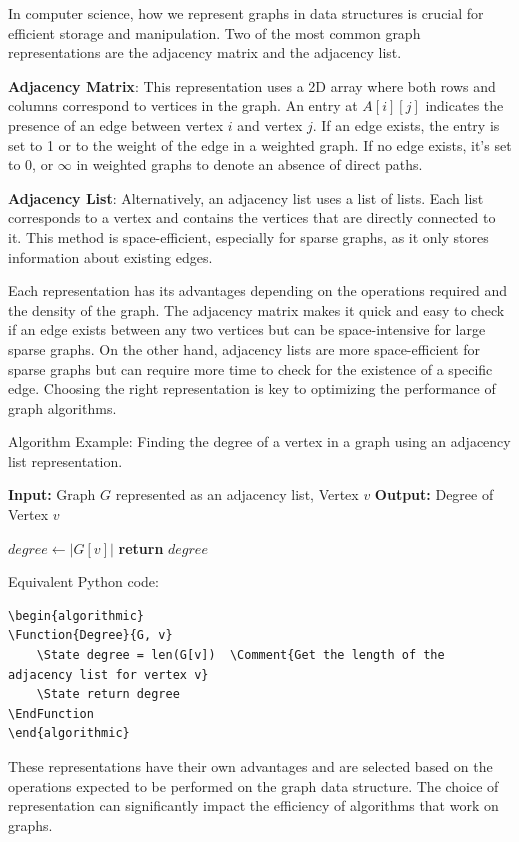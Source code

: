 \documentclass[12pt]{book} %
\begin{document}
In computer science, how we represent graphs in data structures is crucial for efficient storage and manipulation. Two of the most common graph representations are the adjacency matrix and the adjacency list.

\textbf{Adjacency Matrix}: This representation uses a 2D array where both rows and columns correspond to vertices in the graph. An entry at \(A[i][j]\) indicates the presence of an edge between vertex \(i\) and vertex \(j\). If an edge exists, the entry is set to 1 or to the weight of the edge in a weighted graph. If no edge exists, it's set to 0, or \(\infty\) in weighted graphs to denote an absence of direct paths.

\textbf{Adjacency List}: Alternatively, an adjacency list uses a list of lists. Each list corresponds to a vertex and contains the vertices that are directly connected to it. This method is space-efficient, especially for sparse graphs, as it only stores information about existing edges.

Each representation has its advantages depending on the operations required and the density of the graph. The adjacency matrix makes it quick and easy to check if an edge exists between any two vertices but can be space-intensive for large sparse graphs. On the other hand, adjacency lists are more space-efficient for sparse graphs but can require more time to check for the existence of a specific edge. Choosing the right representation is key to optimizing the performance of graph algorithms.


Algorithm Example: Finding the degree of a vertex in a graph using an adjacency list representation.
\FloatBarrier
\begin{algorithm}
\caption{Find Degree of a Vertex using Adjacency List}
\begin{algorithmic}
\State \textbf{Input:} Graph $G$ represented as an adjacency list, Vertex $v$
\State \textbf{Output:} Degree of Vertex $v$

    \State $degree \gets |G[v]|$ 
    \State \textbf{return} $degree$
\EndFunction
\end{algorithmic}
\end{algorithm}
\FloatBarrier
Equivalent Python code:
\FloatBarrier
\begin{lstlisting}
\begin{algorithmic}
\Function{Degree}{G, v}
    \State degree = len(G[v])  \Comment{Get the length of the adjacency list for vertex v}
    \State return degree
\EndFunction
\end{algorithmic}
\end{lstlisting}
\FloatBarrier
These representations have their own advantages and are selected based on the operations expected to be performed on the graph data structure. The choice of representation can significantly impact the efficiency of algorithms that work on graphs.
\end{document}
